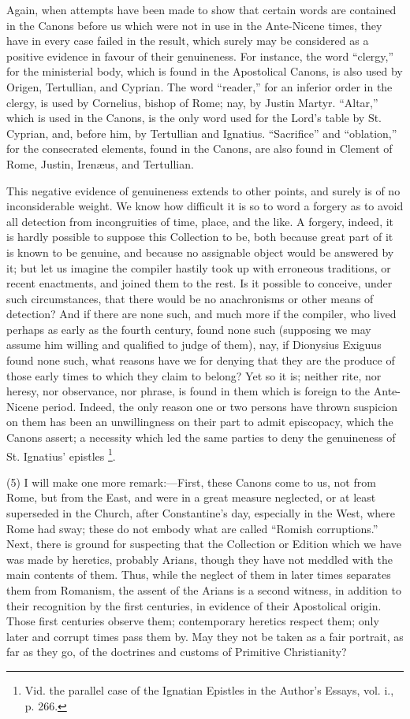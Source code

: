 Again, when attempts have been made to show that certain words are
contained in the Canons before us which were not in use in the
Ante-Nicene times, they have in every case failed in the result, which
surely may be considered as a positive evidence in favour of their
genuineness. For instance, the word ``clergy,'' for the
ministerial body, which is found in the Apostolical Canons, is also
used by Origen, Tertullian, and Cyprian. The word ``reader,''
for an inferior order in the clergy, is used by Cornelius, bishop of
Rome; nay, by Justin Martyr. ``Altar,'' which is used in the
Canons, is the only word used for the Lord's table by St. Cyprian,
and, before him, by Tertullian and Ignatius. ``Sacrifice'' and
``oblation,'' for the consecrated elements, found in the
Canons, are also found in Clement of Rome, Justin, Irenæus, and
Tertullian.

This negative evidence of genuineness extends to other points, and
surely is of no inconsiderable weight. We know how difficult it is so
to word a forgery as to avoid all detection from incongruities of
time, place, and the like. A forgery, indeed, it is hardly possible to
suppose this Collection to be, both because great part of it is known
to be genuine, and because no assignable object would be answered by
it; but let us imagine the compiler hastily took up with erroneous
traditions, or recent enactments, and joined them to the rest. Is it
possible to conceive, under such circumstances, that there would be no
anachronisms or other means of detection? And if there are none such,
and much more if the compiler, who lived perhaps as early as the
fourth century, found none such (supposing we may assume him willing
and qualified to judge of them), nay, if Dionysius Exiguus found none
such, what reasons have we for denying that they are the produce of
those early times to which they claim to belong? Yet so it is; neither
rite, nor heresy, nor observance, nor phrase, is found in them which
is foreign to the Ante-Nicene period. Indeed, the only reason
one or two persons have thrown suspicion on them has been an
unwillingness on their part to admit episcopacy, which the Canons
assert; a necessity which led the same parties to deny the genuineness
of St. Ignatius' epistles \footnote{Vid. the
parallel case of the Ignatian Epistles in the Author's Essays, vol. i.,
p. 266.}.

(5) I will make one more remark:—First, these Canons come to us,
not from Rome, but from the East, and were in a great measure
neglected, or at least superseded in the Church, after Constantine's
day, especially in the West, where Rome had sway; these do not embody
what are called ``Romish corruptions.'' Next, there is ground
for suspecting that the Collection or Edition which we have was made
by heretics, probably Arians, though they have not meddled with the
main contents of them. Thus, while the neglect of them in later times
separates them from Romanism, the assent of the Arians is a second
witness, in addition to their recognition by the first centuries, in
evidence of their Apostolical origin. Those first centuries observe
them; contemporary heretics respect them; only later and corrupt times
pass them by. May they not be taken as a fair portrait, as far as they
go, of the doctrines and customs of Primitive Christianity?

